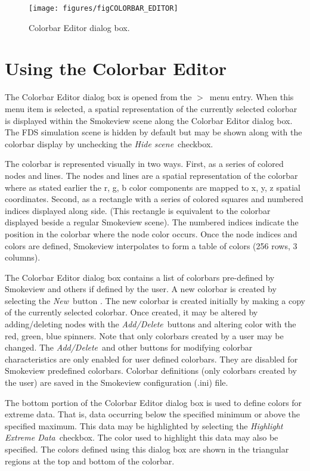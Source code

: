 \documentclass[11pt,twoside]{book}
\newcommand{\figoptions}{hbp}
\newcommand{\frameit}[1]{\fbox{\tt #1}}
\begin{document}
\begin{figure}[\figoptions]
\begin{center}
\texttt{[image: figures/figCOLORBAR\_EDITOR]}
\end{center}
\caption[Colorbar Editor dialog box.]{
Colorbar Editor dialog box.} \label{figCOLORBAR}
\end{figure}

\section{Using the Colorbar Editor}
The Colorbar Editor dialog box is opened from the
\frameit{Dialogs}$>$\frameit{Customize Colorbar}\ menu entry.
When this menu item is selected, a spatial representation of the currently
selected colorbar is displayed within the Smokeview scene along the
Colorbar Editor dialog box.  The FDS simulation scene is hidden by default
but may be shown along with the colorbar display by unchecking the
{\em Hide scene}\ checkbox.

The colorbar is represented visually in two ways.  First, as a series
of colored nodes and lines.
The nodes and lines are a spatial representation of the colorbar where as
stated earlier the r, g, b color components are mapped to x, y, z spatial
coordinates.
Second, as a rectangle with a series of colored squares and numbered
indices
displayed along side. (This rectangle is equivalent to the colorbar
displayed beside a regular Smokeview scene).  The numbered indices indicate
the position in the colorbar where the node color occurs.
Once the node indices and colors are defined, Smokeview interpolates to
form a table of colors (256 rows, 3 columns).

The Colorbar Editor dialog box contains a list of colorbars
pre-defined by Smokeview and others if defined by the user.
A new colorbar is created by selecting the
{\em New}\ button . The new colorbar is created initially by making
a copy of the
currently selected colorbar. Once created, it may be altered by
adding/deleting nodes with the {\em Add/Delete}\ buttons and
altering color with the red, green, blue spinners.
Note that only colorbars created by a user may be changed.
The {\em Add/Delete}\ and other buttons for modifying colorbar characteristics are only enabled for user defined colorbars.  They are disabled for Smokeview predefined colorbars.
Colorbar definitions (only colorbars created by the user) are saved
in the Smokeview configuration (.ini) file.

The bottom portion of the Colorbar Editor dialog box is used to define colors for extreme data.  That is, data occurring below the specified minimum or above the specified maximum.  This data
may be highlighted by selecting the {\em Highlight Extreme Data}\ checkbox.
The color used to highlight this data may also be specified.  The colors
defined using this dialog box are shown in the triangular regions at the top and bottom of the
colorbar.
\end{document}
